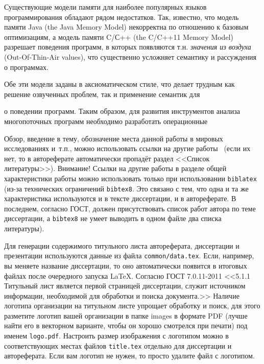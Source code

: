 Существующие модели памяти для наиболее популярных языков программирования обладают рядом недостатков.
Так, известно, что модель памяти Java (the Java Memory Model) некорректна по отношению
к базовым оптимизациям, а модель памяти C/С++ (the C/C++11 Memory Model) разрешает
поведения программ, в которых появляются т.н. \emph{значения из воздуха} (Out-Of-Thin-Air values),
что существенно усложняет семантику и рассуждения о программах.

Обе эти модели заданы в аксиоматическом стиле, что делает трудным как решение озвученных
проблем, так и применение семантик для

о поведении программ.
Таким образом, для развития инструментов анализа многопоточных программ необходимо
разработать операционные 

Обзор, введение в тему, обозначение места данной работы в
мировых исследованиях и~т.\:п., можно использовать ссылки на другие
работы~\cite{Gosele1999161} (если их нет, то в автореферате
автоматически пропадёт раздел <<Список литературы>>). Внимание! Ссылки
на другие работы в разделе общей характеристики работы можно
использовать только при использовании \verb!biblatex! (из-за технических
ограничений \verb!bibtex8!. Это связано с тем, что одна и та же
характеристика используются и в тексте диссертации, и в
автореферате. В последнем, согласно ГОСТ, должен присутствовать список
работ автора по теме диссертации, а \verb!bibtex8! не умеет выводить в одном
файле два списка литературы).

Для генерации содержимого титульного листа автореферата, диссертации и
презентации используются данные из файла \verb!common/data.tex!. Если,
например, вы меняете название диссертации, то оно автоматически
появится в итоговых файлах после очередного запуска \LaTeX. Согласно
ГОСТ 7.0.11-2011 <<5.1.1 Титульный лист является первой страницей
диссертации, служит источником информации, необходимой для обработки и
поиска документа.>> Наличие логотипа организации на титульном листе
упрощает обработку и поиск, для этого разметите логотип вашей
организации в папке images в формате PDF (лучше найти его в векторном
варианте, чтобы он хорошо смотрелся при печати) под именем
\verb!logo.pdf!. Настроить размер изображения с логотипом можно в
соответствующих местах файлов \verb!title.tex!  отдельно для
диссертации и автореферата. Если вам логотип не нужен, то просто
удалите файл с логотипом.



